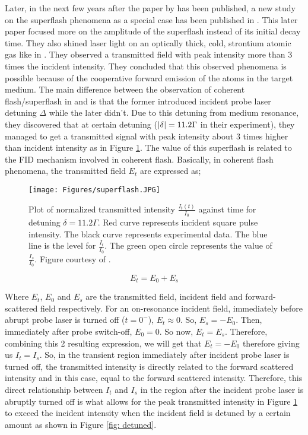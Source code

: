 Later, in the next few years after the paper by  has been published, a new study on the superflash phenomena as a special case has been published in . This later paper focused more on the amplitude of the superflash instead of its initial decay time. They also shined laser light on an optically thick, cold, strontium atomic gas like in . They observed a transmitted field with peak intensity more than 3 times the incident intensity. They concluded that this observed phenomena is possible because of the cooperative forward emission of the atoms in the target medium. The main difference between the observation of coherent flash/superflash in  and  is that the former introduced incident probe laser detuning $\Delta$ while the later didn't. Due to this detuning from medium resonance, they discovered that at certain detuning ($\abs{\delta} = 11.2 \Gamma$ in their experiment), they managed to get a transmitted signal with peak intensity about 3 times higher than incident intensity as in Figure \ref{fig: superflash}. The value of this superflash is related to the FID mechanism involved in coherent flash. Basically, in coherent flash phenomena, the transmitted field $E_{t}$ are expressed as;

\begin{figure}
    \centering
    \texttt{[image: Figures/superflash.JPG]}
    \caption[Plot of Transmitted Intensity for Detuned ($\Delta = 11.2\Gamma$) Incident Probe Laser]{Plot of normalized transmitted intensity $\frac{I_{t}(t)}{I_{0}}$ against time for detuning $\delta = 11.2\Gamma$. Red curve represents incident square pulse intensity. The black curve represents experimental data. The blue line is the level for $\frac{I_t}{I_0}$. The green open circle represents the value of $\frac{I_{s}}{I_{0}}$. Figure courtesy of \protect{}.}
    \label{fig: superflash}
\end{figure}

\begin{equation}
    E_{t} = E_{0} + E_{s}
\end{equation}

Where $E_{t}$, $E_{0}$ and $E_{s}$ are the transmitted field, incident field and forward-scattered field respectively. For an on-resonance incident field, immediately before abrupt probe laser is turned off ($t = 0^{-}$), $E_{t} \approx 0$. So, $E_{s} = - E_{0}$. Then, immediately after probe switch-off, $E_{0} = 0$. So now, $E_{t} = E_{s}$. Therefore, combining this 2 resulting expression, we will get that $E_{t} = - E_{0}$ therefore giving us $I_{t} = I_{s}$. So, in the transient region immediately after incident probe laser is turned off, the transmitted intensity is directly related to the forward scattered intensity and in this case, equal to the forward scattered intensity. Therefore, this direct relationship between $I_{t}$ and $I_{s}$ in the region after the incident probe laser is abruptly turned off is what allows for the peak transmitted intensity in Figure \ref{fig: superflash} to exceed the incident intensity when the incident field is detuned by a certain amount as shown in Figure \ref{fig: detuned}.

